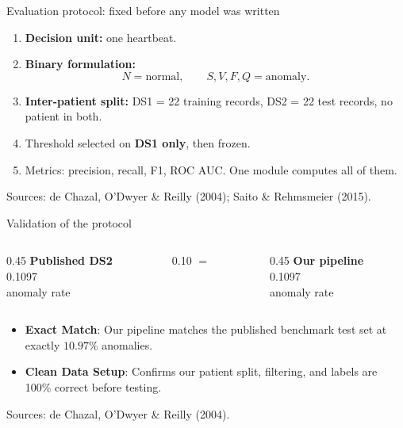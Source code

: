 \documentclass[aspectratio=169,10pt]{beamer}
\newcommand{\sources}[1]{%
  \vfill
  {\tiny\color{gray}Sources: #1}
}
\begin{document}
\begin{frame}{Evaluation protocol: fixed before any model was written}

  \begin{enumerate}
    \item \textbf{Decision unit:} one heartbeat.
    \item \textbf{Binary formulation:}
    \[
      N = \text{normal},
      \qquad
      S,V,F,Q = \text{anomaly}.
    \]
    \item \textbf{Inter-patient split:} DS1 = 22 training records, DS2 = 22 test records,
      no patient in both.
    \item Threshold selected on \textbf{DS1 only}, then frozen.
    \item Metrics: precision, recall, F1, ROC AUC. One module computes all of them.
  \end{enumerate}

  \sources{de Chazal, O'Dwyer \& Reilly (2004); Saito \& Rehmsmeier (2015).}

\end{frame}


\begin{frame}{Validation of the protocol}

  \begin{columns}[T]

    \begin{column}{0.45\textwidth}
      \centering
      \Large \textbf{Published DS2}\\[0.5em]
      \Huge 0.1097\\
      \normalsize anomaly rate
    \end{column}

    \begin{column}{0.10\textwidth}
      \centering
      \Huge $=$
    \end{column}

    \begin{column}{0.45\textwidth}
      \centering
      \Large \textbf{Our pipeline}\\[0.5em]
      \Huge \alert{0.1097}\\
      \normalsize anomaly rate
    \end{column}

  \end{columns}

  \vfill

 \begin{itemize}
  \item \textbf{Exact Match}: Our pipeline matches the published benchmark test set at exactly $10.97\%$ anomalies.
  \item \textbf{Clean Data Setup}: Confirms our patient split, filtering, and labels are 100\% correct before testing.
\end{itemize}

  \sources{de Chazal, O'Dwyer \& Reilly (2004).}

\end{frame}
\end{document}

